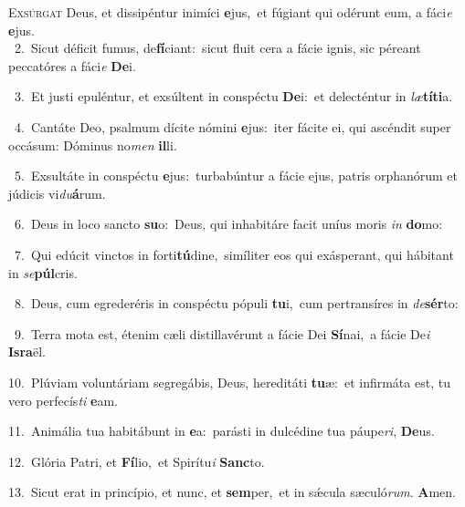 \lettrine{\initial\textcolor{\initialcolor}{E}}{xsúrgat} Deus, et dissipéntur inimíci \textbf{e}\-jus,~\star et fúgiant qui odérunt eum, a fáci\textit{e} \textbf{e}\-jus.\\
{\numbfont\textcolor{\numbcolor}{~2.}}~Sicut déficit fumus, de\-\textbf{fí}\-ciant:~\star sicut fluit cera a fácie ignis, sic péreant peccatóres a fáci\textit{e} \textbf{De}\-i.\par
{\numbfont\textcolor{\numbcolor}{~3.}}~Et justi epuléntur, et exsúltent in conspéctu \textbf{De}\-i:~\star et delecténtur in \textit{læ}\-\textbf{tí}\textbf{ti}a.\par
{\numbfont\textcolor{\numbcolor}{~4.}}~Cantáte Deo, psalmum dícite nómini \textbf{e}\-jus:~\star iter fácite ei, qui ascéndit super occásum: Dóminus no\textit{men} \textbf{il}\-li.\par
{\numbfont\textcolor{\numbcolor}{~5.}}~Exsultáte in conspéctu \textbf{e}\-jus:~\star turbabúntur a fácie ejus, patris orphanórum et júdicis vi\-\textit{du}\-\textbf{á}rum.\par
{\numbfont\textcolor{\numbcolor}{~6.}}~Deus in loco sancto \textbf{su}\-o:~\star Deus, qui inhabitáre facit uníus moris \textit{in} \textbf{do}\-mo:\par
{\numbfont\textcolor{\numbcolor}{~7.}}~Qui edúcit vinctos in forti\-\textbf{tú}\-dine,~\star simíliter eos qui exásperant, qui hábitant in \textit{se}\-\textbf{púl}cris.\par
{\numbfont\textcolor{\numbcolor}{~8.}}~Deus, cum egrederéris in conspéctu pópuli \textbf{tu}\-i,~\star cum pertransíres in \textit{de}\-\textbf{sér}to:\par
{\numbfont\textcolor{\numbcolor}{~9.}}~Terra mota est, étenim cæli distillavérunt a fácie Dei \textbf{Sí}\-nai,~\star a fácie De\textit{i} \textbf{Is}\-\textbf{ra}ël.\par
{\numbfont\textcolor{\numbcolor}{10.}}~Plúviam voluntáriam segregábis, Deus, hereditáti \textbf{tu}\-æ:~\star et infirmáta est, tu vero perfecís\textit{ti} \textbf{e}\-am.\par
{\numbfont\textcolor{\numbcolor}{11.}}~Animália tua habitábunt in \textbf{e}\-a:~\star parásti in dulcédine tua páupe\-\textit{ri}\-, \textbf{De}\-us.\par
{\numbfont\textcolor{\numbcolor}{12.}}~Glória Patri, et \textbf{Fí}\-lio,~\star et Spirítu\textit{i} \textbf{Sanc}\-to.\par
{\numbfont\textcolor{\numbcolor}{13.}}~Sicut erat in princípio, et nunc, et \textbf{sem}\-per,~\star et in sǽcula sæculó\-\textit{rum}\-. \textbf{A}\-men.\par
